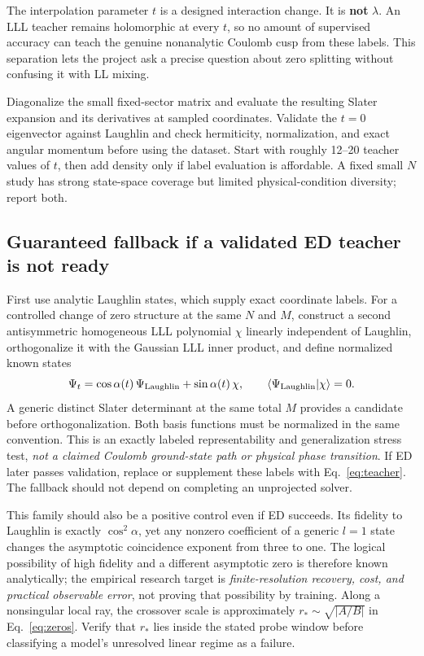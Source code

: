 \documentclass[11pt,letterpaper]{article}
\newcommand{\avg}[1]{\left\langle #1\right\rangle}
\begin{document}
The interpolation parameter $t$ is a designed interaction change. It is \textbf{not} $\lambda$. An LLL teacher remains holomorphic at every $t$, so no amount of supervised accuracy can teach the genuine nonanalytic Coulomb cusp from these labels. This separation lets the project ask a precise question about zero splitting without confusing it with LL mixing.

Diagonalize the small fixed-sector matrix and evaluate the resulting Slater expansion and its derivatives at sampled coordinates. Validate the $t=0$ eigenvector against Laughlin and check hermiticity, normalization, and exact angular momentum before using the dataset. Start with roughly 12--20 teacher values of $t$, then add density only if label evaluation is affordable. A fixed small $N$ study has strong state-space coverage but limited physical-condition diversity; report both.

\subsection{Guaranteed fallback if a validated ED teacher is not ready}

First use analytic Laughlin states, which supply exact coordinate labels. For a controlled change of zero structure at the same $N$ and $M$, construct a second antisymmetric homogeneous LLL polynomial $\chi$ linearly independent of Laughlin, orthogonalize it with the Gaussian LLL inner product, and define normalized known states
\begin{equation}
 \Psi_t=\cos\alpha(t)\,\Psi_{\rm Laughlin}
 +\sin\alpha(t)\,\chi,\qquad \avg{\Psi_{\rm Laughlin}|\chi}=0.
 \label{eq:analyticteacher}
\end{equation}
A generic distinct Slater determinant at the same total $M$ provides a candidate before orthogonalization. Both basis functions must be normalized in the same convention. This is an exactly labeled representability and generalization stress test, \emph{not a claimed Coulomb ground-state path or physical phase transition}. If ED later passes validation, replace or supplement these labels with Eq.~\eqref{eq:teacher}. The fallback should not depend on completing an unprojected solver.

This family should also be a positive control even if ED succeeds. Its fidelity to Laughlin is exactly $\cos^2\alpha$, yet any nonzero coefficient of a generic $l=1$ state changes the asymptotic coincidence exponent from three to one. The logical possibility of high fidelity and a different asymptotic zero is therefore known analytically; the empirical research target is \emph{finite-resolution recovery, cost, and practical observable error}, not proving that possibility by training. Along a nonsingular local ray, the crossover scale is approximately $r_*\sim\sqrt{|A/B|}$ in Eq.~\eqref{eq:zeros}. Verify that $r_*$ lies inside the stated probe window before classifying a model's unresolved linear regime as a failure.
\end{document}
